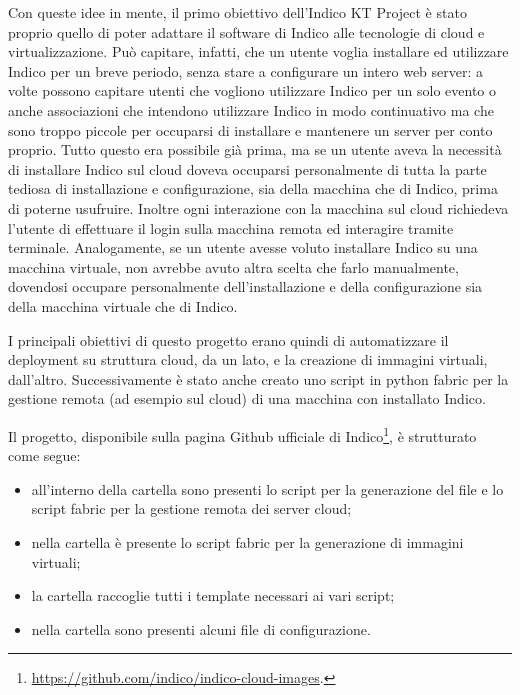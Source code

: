     Con queste idee in mente, il primo obiettivo dell'Indico KT Project è stato proprio quello di poter adattare il software di Indico alle tecnologie di cloud e virtualizzazione. Può capitare, infatti, che un utente voglia installare ed utilizzare Indico per un breve periodo, senza stare a configurare un intero web server: a volte possono capitare utenti che vogliono utilizzare Indico per un solo evento o anche associazioni che intendono utilizzare Indico in modo continuativo ma che sono troppo piccole per occuparsi di installare e mantenere un server per conto proprio. Tutto questo era possibile già prima, ma se un utente aveva la necessità di installare Indico sul cloud doveva occuparsi personalmente di tutta la parte tediosa di installazione e configurazione, sia della macchina che di Indico, prima di poterne usufruire. Inoltre ogni interazione con la macchina sul cloud richiedeva l'utente di effettuare il login sulla macchina remota ed interagire tramite terminale. Analogamente, se un utente avesse voluto installare Indico su una macchina virtuale, non avrebbe avuto altra scelta che farlo manualmente, dovendosi occupare personalmente dell'installazione e della configurazione sia della macchina virtuale che di Indico.
    
    I principali obiettivi di questo progetto erano quindi di automatizzare il deployment su struttura cloud, da un lato, e la creazione di immagini virtuali, dall'altro. Successivamente è stato anche creato uno script in python fabric per la gestione remota (ad esempio sul cloud) di una macchina con installato Indico.
    
    Il progetto, disponibile sulla pagina Github ufficiale di Indico\footnote{\url{https://github.com/indico/indico-cloud-images}.}, è strutturato come segue:
    
    \begin{itemize}
        \item all'interno della cartella  sono presenti lo script per la generazione del file  e lo script fabric per la gestione remota dei server cloud;
        \item nella cartella  è presente lo script fabric per la generazione di immagini virtuali;
        \item la cartella  raccoglie tutti i template necessari ai vari script;
        \item nella cartella  sono presenti alcuni file di configurazione.
    \end{itemize}
    
